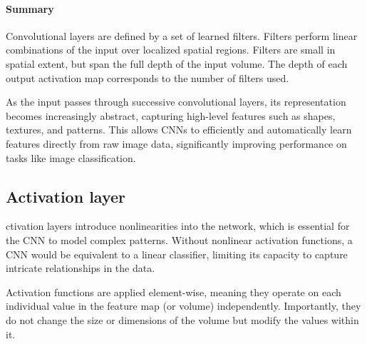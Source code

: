 \paragraph*{Summary}
Convolutional layers are defined by a set of learned filters.
Filters perform linear combinations of the input over localized spatial regions.
Filters are small in spatial extent, but span the full depth of the input volume.
The depth of each output activation map corresponds to the number of filters used.

As the input passes through successive convolutional layers, its representation becomes increasingly abstract, capturing high-level features such as shapes, textures, and patterns. 
This allows CNNs to efficiently and automatically learn features directly from raw image data, significantly improving performance on tasks like image classification.

\subsection{Activation layer}
ctivation layers introduce nonlinearities into the network, which is essential for the CNN to model complex patterns. 
Without nonlinear activation functions, a CNN would be equivalent to a linear classifier, limiting its capacity to capture intricate relationships in the data.

Activation functions are applied element-wise, meaning they operate on each individual value in the feature map (or volume) independently. 
Importantly, they do not change the size or dimensions of the volume but modify the values within it.

